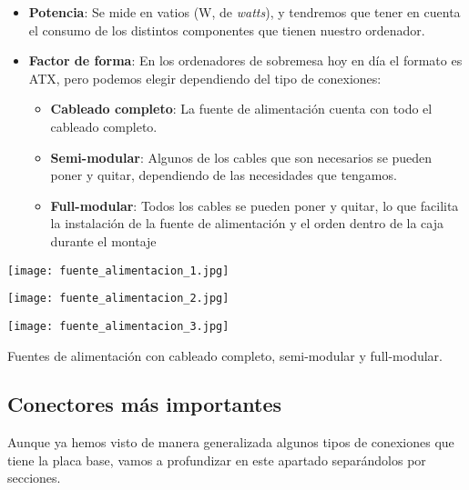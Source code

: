 \begin{itemize}
    \item \textbf{Potencia}: Se mide en vatios (W, de \textit{watts}), y tendremos que tener en cuenta el consumo de los distintos componentes que tienen nuestro ordenador.
    \item \textbf{Factor de forma}: En los ordenadores de sobremesa hoy en día el formato es ATX, pero podemos elegir dependiendo del tipo de conexiones:
    \begin{itemize}
        \item \textbf{Cableado completo}: La fuente de alimentación cuenta con todo el cableado completo.
        \item \textbf{Semi-modular}: Algunos de los cables que son necesarios se pueden poner y quitar, dependiendo de las necesidades que tengamos.

        \item \textbf{Full-modular}: Todos los cables se pueden poner y quitar, lo que facilita la instalación de la fuente de alimentación y el orden dentro de la caja durante el montaje
    \end{itemize}
\end{itemize}
\vspace{15pt}
{
    \hfill
    \begin{minipage}{0.3\linewidth}
        \texttt{[image: fuente\_alimentacion\_1.jpg]}
    \end{minipage}
    \hfill
    \begin{minipage}{0.28\linewidth}
        \texttt{[image: fuente\_alimentacion\_2.jpg]}
    \end{minipage}
    \hfill
    \begin{minipage}{0.24\linewidth}
        \texttt{[image: fuente\_alimentacion\_3.jpg]}
    \end{minipage}
    \vspace{-10pt}
\begin{center}
     \footnotesize{Fuentes de alimentación con cableado completo, semi-modular y full-modular.}
\end{center}
}


\subsection{Conectores más importantes}

Aunque ya hemos visto de manera generalizada algunos tipos de conexiones que tiene la placa base, vamos a profundizar en este apartado separándolos por secciones.

